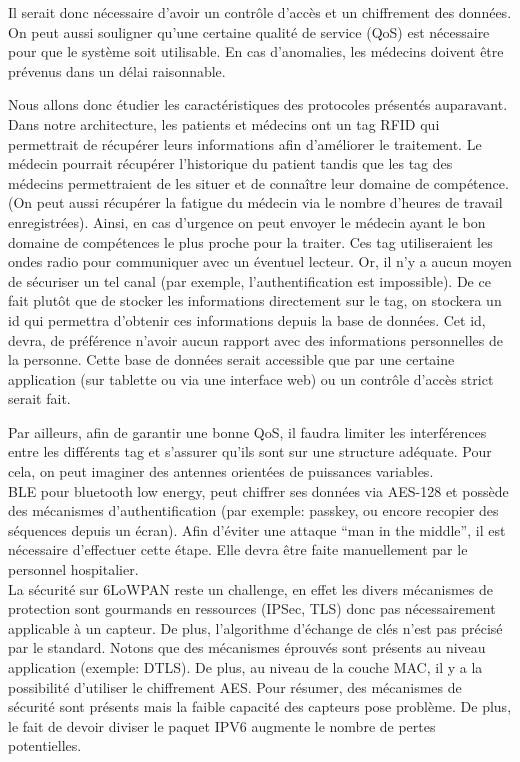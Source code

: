 \documentclass{article}
\begin{document}
Il serait donc nécessaire d’avoir un contrôle d’accès et un chiffrement des données. On peut aussi souligner qu’une certaine qualité de service (QoS) est nécessaire pour que le système soit utilisable. En cas d’anomalies, les médecins doivent être prévenus dans un délai raisonnable. 

Nous allons donc étudier les caractéristiques des protocoles présentés auparavant.
\\

Dans notre architecture, les patients et médecins ont un tag RFID qui permettrait de récupérer leurs informations afin d’améliorer le traitement. Le médecin pourrait récupérer l’historique du patient tandis que les tag des médecins permettraient de les situer et de connaître leur domaine de compétence. (On peut aussi récupérer la fatigue du médecin via le nombre d’heures de travail enregistrées). Ainsi, en cas d’urgence on peut envoyer le médecin ayant le bon domaine de compétences le plus proche pour la traiter. Ces tag utiliseraient les ondes radio pour communiquer avec un éventuel lecteur. Or, il n’y a aucun moyen de sécuriser un tel canal (par exemple, l’authentification est impossible). De ce fait plutôt que de stocker les informations directement sur le tag, on stockera un id qui permettra d’obtenir ces informations depuis la base de données. Cet id, devra, de préférence n’avoir aucun rapport avec des informations personnelles de la personne. Cette base de données serait accessible que par une certaine application (sur tablette ou via une interface web) ou un contrôle d’accès strict serait fait.

Par ailleurs, afin de garantir une bonne QoS, il faudra limiter les interférences entre les différents tag et s’assurer qu’ils sont sur une structure adéquate. Pour cela, on peut imaginer des antennes orientées de puissances variables. 
\\

BLE pour bluetooth low energy, peut chiffrer ses données via AES-128 et possède des mécanismes d’authentification (par exemple: passkey,  ou encore recopier des séquences depuis un écran). Afin d’éviter une attaque “man in the middle”, il est nécessaire d’effectuer cette étape. Elle devra être faite manuellement par le personnel hospitalier. 
\\

La sécurité sur 6LoWPAN reste un challenge, en effet les divers mécanismes de protection sont gourmands en ressources (IPSec, TLS) donc pas nécessairement applicable à un capteur. De plus, l’algorithme d’échange de clés n’est pas précisé par le standard. Notons que des mécanismes éprouvés sont présents au niveau application (exemple: DTLS). De plus, au niveau de la couche MAC, il y a la possibilité d’utiliser le chiffrement AES. Pour résumer, des mécanismes de sécurité sont présents mais la faible capacité des capteurs pose problème. De plus, le fait de devoir diviser le paquet IPV6 augmente le nombre de pertes potentielles.
\\
\end{document}
